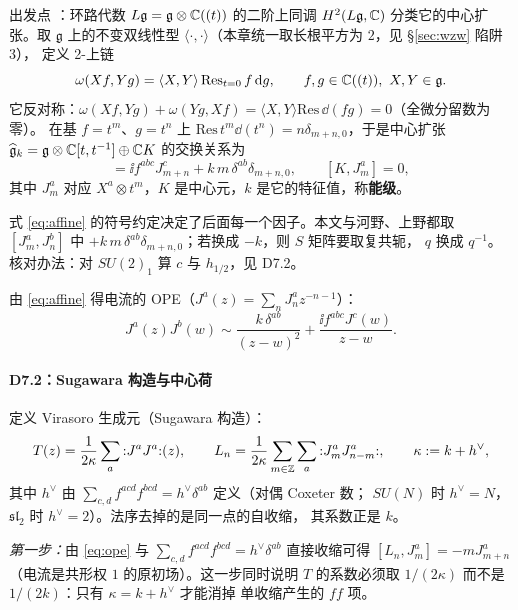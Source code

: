 出发点 ：环路代数 $L\mathfrak g=\mathfrak g\otimes\mathbb{C}((t))$ 的二阶上同调
$H^2(L\mathfrak g,\mathbb{C})$ 分类它的中心扩张。取 $\mathfrak g$ 上的不变双线性型
$\langle\cdot,\cdot\rangle$（本章统一取长根平方为 $2$，见 \S\ref{sec:wzw} 陷阱 3），
定义 2-上链
\[
\omega(Xf,Yg)=\langle X,Y\rangle\,\mathrm{Res}_{t=0}\,f\,\mathrm{d} g ,
\qquad f,g\in\mathbb{C}((t)),\ X,Y\in\mathfrak g .
\]
\ours
它反对称：$\omega(Xf,Yg)+\omega(Yg,Xf)=\langle X,Y\rangle\mathrm{Res}\,\dd(fg)=0$（全微分留数为零）。
在基 $f=t^m$、$g=t^n$ 上 $\mathrm{Res}\,t^m\dd(t^n)=n\delta_{m+n,0}$，于是中心扩张
$\widehat{\mathfrak g}_k=\mathfrak g\otimes\mathbb{C}[t,t^{-1}]\oplus\mathbb{C} K$ 的交换关系为
\begin{equation}
[J^a_m,J^b_n]=\ii f^{abc}J^c_{m+n}+k\,m\,\delta^{ab}\delta_{m+n,0},
\qquad [K,J^a_m]=0 ,
\label{eq:affine}
\end{equation}
其中 $J^a_m$ 对应 $X^a\otimes t^m$，$K$ 是中心元，$k$ 是它的特征值，称\textbf{能级}。
\begin{keypoint}
式 \eqref{eq:affine} 的符号约定决定了后面每一个因子。本文与河野、上野都取
$[J^a_m,J^b_n]$ 中 $+k\,m\,\delta^{ab}\delta_{m+n,0}$；若换成 $-k$，则 $S$ 矩阵要取复共轭，
$q$ 换成 $q^{-1}$。核对办法：对 $SU(2)_1$ 算 $c$ 与 $h_{1/2}$，见 D7.2。
\end{keypoint}

由 \eqref{eq:affine} 得电流的 OPE（$J^a(z)=\sum_n J^a_n z^{-n-1}$）：
\begin{equation}
J^a(z)J^b(w)\sim\frac{k\,\delta^{ab}}{(z-w)^2}+\frac{\ii f^{abc}J^c(w)}{z-w}.
\label{eq:ope}
\end{equation}

\paragraph{D7.2：Sugawara 构造与中心荷}

定义 Virasoro 生成元（Sugawara 构造）：
\begin{equation}
T(z)=\frac{1}{2\kappa}\sum_a {:}J^aJ^a{:}(z),
\qquad
L_n=\frac{1}{2\kappa}\sum_{m\in\mathbb{Z}}\sum_a {:}J^a_mJ^a_{n-m}{:},
\qquad \kappa:=k+h^\vee ,
\label{eq:sugawara}
\end{equation}
其中 $h^\vee$ 由 $\sum_{c,d}f^{acd}f^{bcd}=h^\vee\delta^{ab}$ 定义（对偶 Coxeter 数；
$SU(N)$ 时 $h^\vee=N$，$\mathfrak{sl}_2$ 时 $h^\vee=2$）。法序去掉的是同一点的自收缩，
其系数正是 $k$。

\emph{第一步：}由 \eqref{eq:ope} 与 $\sum_{c,d}f^{acd}f^{bcd}=h^\vee\delta^{ab}$ 直接收缩可得
$[L_n,J^a_m]=-mJ^a_{m+n}$（电流是共形权 $1$ 的原初场）。这一步同时说明
$T$ 的系数必须取 $1/(2\kappa)$ 而不是 $1/(2k)$：只有 $\kappa=k+h^\vee$ 才能消掉
单收缩产生的 $f f$ 项。

